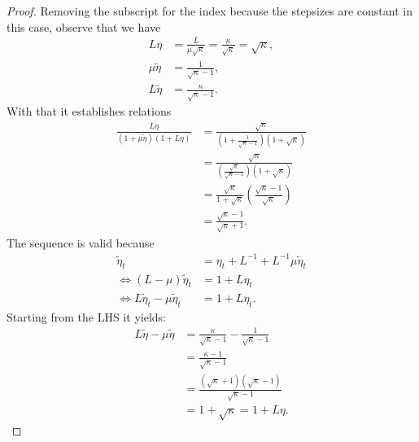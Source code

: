 \documentclass[12pt]{article}
\begin{document}
        \begin{proof}
            Removing the subscript for the index because the stepsizes are constant in this case, observe that we have 
            $$
            \begin{aligned}
                L\eta &= \frac{L}{\mu \sqrt{\kappa}} = \frac{\kappa}{\sqrt{\kappa}} = \sqrt{\kappa}, 
                \\
                \mu \tilde \eta &= 
                \frac{1}{\sqrt{\kappa} - 1}, 
                \\
                L\tilde \eta &= 
                \frac{\kappa}{\sqrt{\kappa} - 1}. 
            \end{aligned}
            $$
            With that it establishes relations
            $$
            \begin{aligned}
                \frac{L\eta }{(1 + \mu \tilde \eta)(1 + L\eta)}
                &= 
                \frac{\sqrt{\kappa}}{
                    \left(
                        1 + \frac{1}{\sqrt{\kappa} - 1}
                    \right)
                    \left(
                        1 + \sqrt{\kappa}
                    \right)
                }
                \\
                &= \frac{\sqrt{\kappa}}{
                    \left(
                        \frac{\sqrt{\kappa}}{\sqrt{\kappa} - 1}
                    \right)(1 + \sqrt{\kappa})
                }
                \\
                &=
                \frac{\sqrt{\kappa}}{1 + \sqrt{\kappa}}\left(
                    \frac{\sqrt{\kappa} - 1}{\sqrt{\kappa}}
                \right)
                \\
                &= 
                \frac{\sqrt{\kappa} - 1}{\sqrt{\kappa} + 1}. 
            \end{aligned}
            $$
            The sequence is valid because 
            $$
            \begin{aligned}
                \tilde \eta_{t} 
                &= \eta_t + L^{-1} + L^{-1} \mu \tilde \eta_{t}
                \\
                \iff
                (L - \mu)\tilde \eta_{t}
                &= 
                1 + L \eta_t 
                \\
                \iff
                L \tilde \eta_{t} - 
                \mu \tilde \eta_{t}
                &= 1 + L \eta_t. 
            \end{aligned}
            $$
            Starting from the LHS it yields: 
            $$
            \begin{aligned}
                L\tilde \eta - \mu \tilde \eta 
                &= \frac{\kappa}{\sqrt{\kappa} - 1} - 
                \frac{1}{\sqrt{\kappa} - 1}
                \\
                &= 
                \frac{\kappa - 1}{\sqrt{\kappa} - 1}
                \\
                &= 
                \frac{(\sqrt{\kappa} + 1)(\sqrt{\kappa} - 1)}{\sqrt{\kappa} - 1}
                \\
                &= 1 + \sqrt{\kappa} = 1 + L \eta. 
            \end{aligned}
            $$
        \end{proof}
\end{document}
